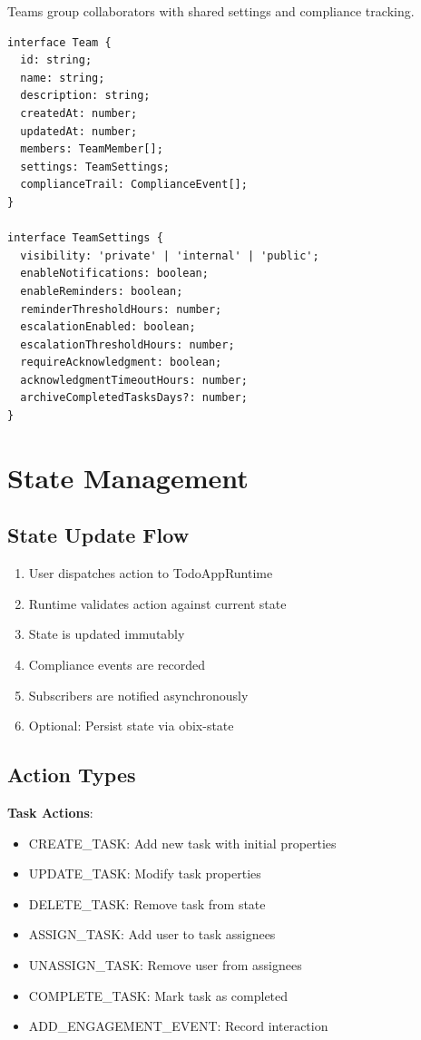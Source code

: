 \documentclass[12pt,a4paper]{article}
\begin{document}
Teams group collaborators with shared settings and compliance tracking.

\begin{lstlisting}
interface Team {
  id: string;
  name: string;
  description: string;
  createdAt: number;
  updatedAt: number;
  members: TeamMember[];
  settings: TeamSettings;
  complianceTrail: ComplianceEvent[];
}

interface TeamSettings {
  visibility: 'private' | 'internal' | 'public';
  enableNotifications: boolean;
  enableReminders: boolean;
  reminderThresholdHours: number;
  escalationEnabled: boolean;
  escalationThresholdHours: number;
  requireAcknowledgment: boolean;
  acknowledgmentTimeoutHours: number;
  archiveCompletedTasksDays?: number;
}
\end{lstlisting}

\section{State Management}

\subsection{State Update Flow}

\begin{enumerate}
  \item User dispatches action to TodoAppRuntime
  \item Runtime validates action against current state
  \item State is updated immutably
  \item Compliance events are recorded
  \item Subscribers are notified asynchronously
  \item Optional: Persist state via obix-state
\end{enumerate}

\subsection{Action Types}

\textbf{Task Actions}:
\begin{itemize}
  \item CREATE\_TASK: Add new task with initial properties
  \item UPDATE\_TASK: Modify task properties
  \item DELETE\_TASK: Remove task from state
  \item ASSIGN\_TASK: Add user to task assignees
  \item UNASSIGN\_TASK: Remove user from assignees
  \item COMPLETE\_TASK: Mark task as completed
  \item ADD\_ENGAGEMENT\_EVENT: Record interaction
\end{itemize}
\end{document}
